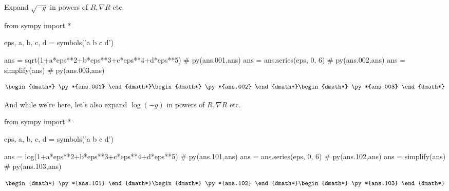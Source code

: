 \documentclass[12pt]{pylatex}
\begin{document}
Expand $\sqrt{-g}$ in powers of $R,\nabla R$ etc.

\begin{python}
   from sympy import *

   eps, a, b, c, d = symbols('\epsilon a b c d')

   ans = sqrt(1+a*eps**2+b*eps**3+c*eps**4+d*eps**5)   # py(ans.001,ans)
   ans = ans.series(eps, 0, 6)                         # py(ans.002,ans)
   ans = simplify(ans)                                 # py(ans.003,ans)

\end{python}

\begin{dgroup*}
   \begin{dmath*} \py*{ans.001} \end{dmath*}
   \begin{dmath*} \py*{ans.002} \end{dmath*}
   \begin{dmath*} \py*{ans.003} \end{dmath*}
\end{dgroup*}

And while we're here, let's also expand $\log(-g)$ in powers of $R,\nabla R$ etc.

\begin{python}
   from sympy import *

   eps, a, b, c, d = symbols('\epsilon a b c d')

   ans = log(1+a*eps**2+b*eps**3+c*eps**4+d*eps**5)    # py(ans.101,ans)
   ans = ans.series(eps, 0, 6)                         # py(ans.102,ans)
   ans = simplify(ans)                                 # py(ans.103,ans)

\end{python}

\begin{dgroup*}
   \begin{dmath*} \py*{ans.101} \end{dmath*}
   \begin{dmath*} \py*{ans.102} \end{dmath*}
   \begin{dmath*} \py*{ans.103} \end{dmath*}
\end{dgroup*}
\end{document}
